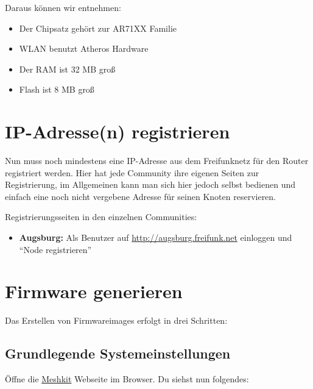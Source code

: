 \documentclass[a4paper,12pt,ngerman]{sphinxmanual}
\begin{document}
Daraus können wir entnehmen:
\begin{itemize}
\item {} 
Der Chipsatz gehört zur AR71XX Familie

\item {} 
WLAN benutzt Atheros Hardware

\item {} 
Der RAM ist 32 MB groß

\item {} 
Flash ist 8 MB groß

\end{itemize}


\section{IP-Adresse(n) registrieren}
\label{generate:ip-adresse-n-registrieren}
Nun muss noch mindestens eine IP-Adresse aus dem Freifunknetz für den Router
registriert werden. Hier hat jede Community ihre eigenen Seiten zur Registrierung,
im Allgemeinen kann man sich hier jedoch selbst bedienen und einfach eine noch
nicht vergebene Adresse für seinen Knoten reservieren.

Registrierungsseiten in den einzelnen Communities:
\begin{itemize}
\item {} 
\textbf{Augsburg:} Als Benutzer auf \href{http://augsburg.freifunk.net}{http://augsburg.freifunk.net} einloggen und ``Node registrieren''

\end{itemize}


\section{Firmware generieren}
\label{generate:firmware-generieren}
Das Erstellen von Firmwareimages erfolgt in drei Schritten:


\subsection{Grundlegende Systemeinstellungen}
\label{generate:grundlegende-systemeinstellungen}
Öffne die \href{http://meshkit.freifunk.net}{Meshkit} Webseite im Browser. Du siehst nun folgendes:
\end{document}
